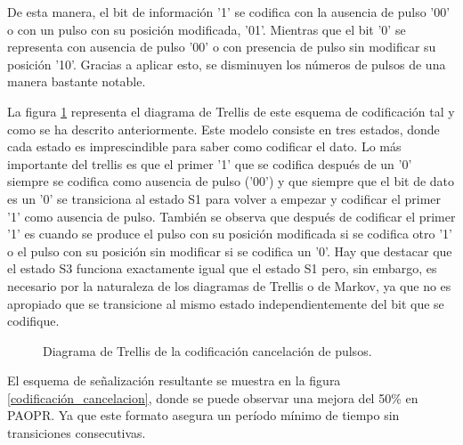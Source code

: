De esta manera, el bit de información '1' se codifica con la ausencia de pulso '00' 
o con un pulso con su posición modificada, '01'. Mientras que el bit '0' se representa con
ausencia de pulso '00' o con presencia de pulso sin modificar su posición '10'. Gracias
a aplicar esto, se disminuyen los números de pulsos de una manera bastante notable. 

La figura \ref{trellis_cancelacion} representa el diagrama de Trellis de este esquema
de codificación tal y como se ha descrito anteriormente. Este modelo consiste en tres 
estados, donde cada estado es imprescindible para saber como codificar el dato.
Lo más importante del trellis es que el primer '1' que se codifica después de un '0'
siempre se codifica como ausencia de pulso ('00') y que siempre que el bit de dato
es un '0' se transiciona al estado S1 para volver a empezar y codificar el primer '1'
como ausencia de pulso. También se observa que después de codificar el primer '1' es 
cuando se produce el pulso con su posición modificada si se codifica otro '1' o el 
pulso con su posición sin modificar si se codifica un '0'.
Hay que destacar que el estado S3 funciona exactamente igual que el estado S1 pero,
sin embargo, es necesario por la naturaleza de los diagramas de Trellis o de Markov, 
ya que no es apropiado que se transicione al mismo estado independientemente del bit 
que se codifique.
\vspace{1cm}

\begin{figure}[ht]
    \centering
    
    \caption{\small{Diagrama de Trellis de la codificación cancelación de pulsos.}}
    \label{trellis_cancelacion}%
\end{figure}

El esquema de señalización resultante se muestra en la figura \ref{codificación_cancelacion},
donde se puede observar una mejora del 50\% en PAOPR. Ya que este formato asegura un 
período mínimo de tiempo sin transiciones consecutivas.

